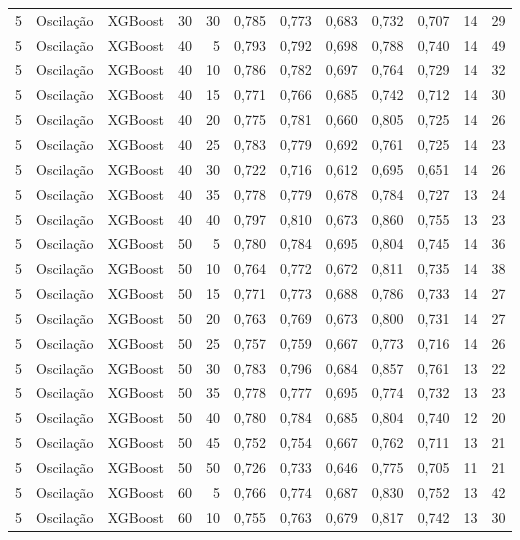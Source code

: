 \begin{longtable}{@{}rllrrrrrrrrr@{}}
5 & Oscilação & XGBoost & 30 & 30 & 0,785 & 0,773 & 0,683 & 0,732 & 0,707 & 14 & 29 \\
5 & Oscilação & XGBoost & 40 & 5 & 0,793 & 0,792 & 0,698 & 0,788 & 0,740 & 14 & 49 \\
5 & Oscilação & XGBoost & 40 & 10 & 0,786 & 0,782 & 0,697 & 0,764 & 0,729 & 14 & 32 \\
5 & Oscilação & XGBoost & 40 & 15 & 0,771 & 0,766 & 0,685 & 0,742 & 0,712 & 14 & 30 \\
5 & Oscilação & XGBoost & 40 & 20 & 0,775 & 0,781 & 0,660 & 0,805 & 0,725 & 14 & 26 \\
5 & Oscilação & XGBoost & 40 & 25 & 0,783 & 0,779 & 0,692 & 0,761 & 0,725 & 14 & 23 \\
5 & Oscilação & XGBoost & 40 & 30 & 0,722 & 0,716 & 0,612 & 0,695 & 0,651 & 14 & 26 \\
5 & Oscilação & XGBoost & 40 & 35 & 0,778 & 0,779 & 0,678 & 0,784 & 0,727 & 13 & 24 \\
5 & Oscilação & XGBoost & 40 & 40 & 0,797 & 0,810 & 0,673 & 0,860 & 0,755 & 13 & 23 \\
5 & Oscilação & XGBoost & 50 & 5 & 0,780 & 0,784 & 0,695 & 0,804 & 0,745 & 14 & 36 \\
5 & Oscilação & XGBoost & 50 & 10 & 0,764 & 0,772 & 0,672 & 0,811 & 0,735 & 14 & 38 \\
5 & Oscilação & XGBoost & 50 & 15 & 0,771 & 0,773 & 0,688 & 0,786 & 0,733 & 14 & 27 \\
5 & Oscilação & XGBoost & 50 & 20 & 0,763 & 0,769 & 0,673 & 0,800 & 0,731 & 14 & 27 \\
5 & Oscilação & XGBoost & 50 & 25 & 0,757 & 0,759 & 0,667 & 0,773 & 0,716 & 14 & 26 \\
5 & Oscilação & XGBoost & 50 & 30 & 0,783 & 0,796 & 0,684 & 0,857 & 0,761 & 13 & 22 \\
5 & Oscilação & XGBoost & 50 & 35 & 0,778 & 0,777 & 0,695 & 0,774 & 0,732 & 13 & 23 \\
5 & Oscilação & XGBoost & 50 & 40 & 0,780 & 0,784 & 0,685 & 0,804 & 0,740 & 12 & 20 \\
5 & Oscilação & XGBoost & 50 & 45 & 0,752 & 0,754 & 0,667 & 0,762 & 0,711 & 13 & 21 \\
5 & Oscilação & XGBoost & 50 & 50 & 0,726 & 0,733 & 0,646 & 0,775 & 0,705 & 11 & 21 \\
5 & Oscilação & XGBoost & 60 & 5 & 0,766 & 0,774 & 0,687 & 0,830 & 0,752 & 13 & 42 \\
5 & Oscilação & XGBoost & 60 & 10 & 0,755 & 0,763 & 0,679 & 0,817 & 0,742 & 13 & 30 \\

\end{longtable}
